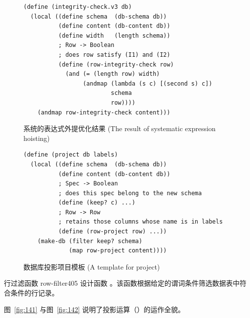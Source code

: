 \begin{figure}[htbp]
  \centering
\begin{lstlisting}[language=BSL, basicstyle=\scriptsize\ttfamily]
(define (integrity-check.v3 db)
  (local ((define schema  (db-schema db))
          (define content (db-content db))
          (define width   (length schema))
          ; Row -> Boolean
          ; does row satisfy (I1) and (I2)
          (define (row-integrity-check row)
            (and (= (length row) width)
                 (andmap (lambda (s c) [(second s) c])
                         schema
                         row))))
    (andmap row-integrity-check content)))
\end{lstlisting}
  \caption{系统的表达式外提优化结果 (The result of systematic expression hoisting)}
  \label{fig:139}
\end{figure}

\begin{figure}[htbp]
  \centering
\begin{lstlisting}[language=BSL, basicstyle=\scriptsize\ttfamily]
(define (project db labels)
  (local ((define schema  (db-schema db))
          (define content (db-content db))
          ; Spec -> Boolean
          ; does this spec belong to the new schema
          (define (keep? c) ...)
          ; Row -> Row
          ; retains those columns whose name is in labels
          (define (row-project row) ...))
    (make-db (filter keep? schema)
             (map row-project content))))
\end{lstlisting}
  \caption{数据库投影项目模板 (A template for project)}
  \label{fig:140}
\end{figure}

\begin{exercise}{行过滤函数 row-filter}{405}
设计函数 。该函数根据给定的谓词条件筛选数据表中符合条件的行记录。
\end{exercise}

图~\ref{fig:141} 与图~\ref{fig:142} 说明了投影运算（）的运作全貌。

